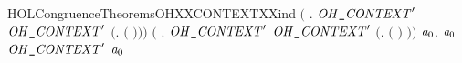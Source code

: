 \begin{SaveVerbatim}{HOLCongruenceTheoremsOHXXCONTEXTXXind}
       \ensuremath{(}\HOLSymConst{\HOLTokenForall{}} . \ensuremath{\HOLBoundVar{OH\HOLTokenUnderscore{}CONTEXT}\sp{\prime}}  \HOLSymConst{\HOLTokenImp{}} \ensuremath{\HOLBoundVar{OH\HOLTokenUnderscore{}CONTEXT}\sp{\prime}} \ensuremath{(}\HOLTokenLambda{}.   \ensuremath{(} \ensuremath{)}\ensuremath{)}\ensuremath{)} \HOLSymConst{\HOLTokenConj{}}
       \ensuremath{(}\HOLSymConst{\HOLTokenForall{}} . \ensuremath{\HOLBoundVar{OH\HOLTokenUnderscore{}CONTEXT}\sp{\prime}}  \HOLSymConst{\HOLTokenImp{}} \ensuremath{\HOLBoundVar{OH\HOLTokenUnderscore{}CONTEXT}\sp{\prime}} \ensuremath{(}\HOLTokenLambda{}.  \ensuremath{(} \ensuremath{)} \ensuremath{)}\ensuremath{)} \HOLSymConst{\HOLTokenImp{}}
       \HOLSymConst{\HOLTokenForall{}}\ensuremath{\HOLBoundVar{a}\sb{\mathrm{0}}}.  \ensuremath{\HOLBoundVar{a}\sb{\mathrm{0}}} \HOLSymConst{\HOLTokenImp{}} \ensuremath{\HOLBoundVar{OH\HOLTokenUnderscore{}CONTEXT}\sp{\prime}} \ensuremath{\HOLBoundVar{a}\sb{\mathrm{0}}}
\end{SaveVerbatim}
\newcommand{\HOLCongruenceTheoremsOHXXCONTEXTXXind}{\UseVerbatim{HOLCongruenceTheoremsOHXXCONTEXTXXind}}
